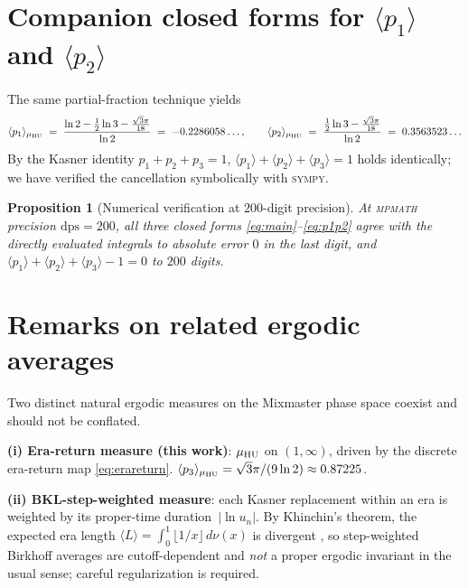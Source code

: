 \documentclass[11pt,a4paper]{article}
\newtheorem{proposition}[theorem]{Proposition}
\begin{document}
\section{Companion closed forms for $\langle p_1\rangle$ and $\langle p_2\rangle$}

The same partial-fraction technique yields
\begin{equation}
  \langle p_1\rangle_{\mu_{\rm HU}}\;=\;
  \frac{\ln 2-\tfrac{1}{2}\ln 3-\tfrac{\sqrt{3}\pi}{18}}{\ln 2}
  \;=\;-0.2286058\ldots,\qquad
  \langle p_2\rangle_{\mu_{\rm HU}}\;=\;
  \frac{\tfrac{1}{2}\ln 3-\tfrac{\sqrt{3}\pi}{18}}{\ln 2}
  \;=\;0.3563523\ldots
\label{eq:p1p2}
\end{equation}
By the Kasner identity $p_1+p_2+p_3=1$,
$\langle p_1\rangle+\langle p_2\rangle+\langle p_3\rangle=1$ holds
identically; we have verified the cancellation symbolically with
\textsc{sympy}.

\begin{proposition}[Numerical verification at $200$-digit precision]
At \textsc{mpmath} precision $\mathrm{dps}=200$, all three closed forms
\eqref{eq:main}--\eqref{eq:p1p2} agree with the directly evaluated integrals
to absolute error $0$ in the last digit, and
$\langle p_1\rangle+\langle p_2\rangle+\langle p_3\rangle-1=0$ to
$200$ digits.
\end{proposition}

\section{Remarks on related ergodic averages}

Two distinct natural ergodic measures on the Mixmaster phase space coexist
and should not be conflated.

\medskip
\noindent\textbf{(i) Era-return measure (this work)}: $\mu_{\rm HU}$ on
$(1,\infty)$, driven by the discrete era-return map \eqref{eq:erareturn}.
$\langle p_3\rangle_{\mu_{\rm HU}}=\sqrt{3}\pi/(9\ln 2)\approx 0.87225$.

\smallskip
\noindent\textbf{(ii) BKL-step-weighted measure}: each Kasner replacement
within an era is weighted by its proper-time duration~$|\ln u_n|$. By
Khinchin's theorem, the expected era length $\langle L\rangle=\int_0^1
\lfloor 1/x\rfloor\,d\nu(x)$ is divergent
\cite{Khinchin1964}, so step-weighted Birkhoff averages are
cutoff-dependent and \emph{not} a proper ergodic invariant in the usual sense;
careful regularization is required.
\end{document}
